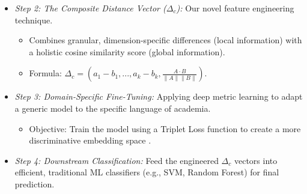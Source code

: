 \documentclass{article}
\begin{document}
\begin{enumerate}
\begin{itemize}
        \item \textit{Step 2: The Composite Distance Vector ($\Delta_{c}$):} Our novel feature engineering technique.
        \begin{itemize}
            \item Combines granular, dimension-specific differences (local information) with a holistic cosine similarity score (global information).
            \item Formula: $\Delta_{c} = (a_{1}-b_{1},...,a_{k}-b_{k}, \frac{A \cdot B}{\|A\|\|B\|})$.
        \end{itemize}
        \item \textit{Step 3: Domain-Specific Fine-Tuning:} Applying deep metric learning to adapt a generic model to the specific language of academia.
        \begin{itemize}
            \item Objective: Train the model using a Triplet Loss function to create a more discriminative embedding space \cite{Schroff_2015_CVPR, hermans2017defensetripletlossperson}.
        \end{itemize}
        \item \textit{Step 4: Downstream Classification:} Feed the engineered $\Delta_{c}$ vectors into efficient, traditional ML classifiers (e.g., SVM, Random Forest) for final prediction.
    \end{itemize}
    

\end{enumerate}
\end{document}
